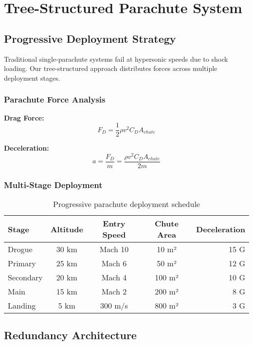 \documentclass[11pt,a4paper]{article}
\begin{document}
\section{Tree-Structured Parachute System}

\subsection{Progressive Deployment Strategy}

Traditional single-parachute systems fail at hypersonic speeds due to shock loading. Our tree-structured approach distributes forces across multiple deployment stages.

\subsubsection{Parachute Force Analysis}

\textbf{Drag Force:}
\begin{equation}
F_D = \frac{1}{2} \rho v^2 C_D A_{chute}
\end{equation}

\textbf{Deceleration:}
\begin{equation}
a = \frac{F_D}{m} = \frac{\rho v^2 C_D A_{chute}}{2m}
\end{equation}

\subsubsection{Multi-Stage Deployment}

\begin{table}[H]
\centering
\begin{tabular}{@{}lcccr@{}}
\toprule
\textbf{Stage} & \textbf{Altitude} & \textbf{Entry Speed} & \textbf{Chute Area} & \textbf{Deceleration} \\
\midrule
Drogue & 30 km & Mach 10 & 10 m² & 15 G \\
Primary & 25 km & Mach 6 & 50 m² & 12 G \\
Secondary & 20 km & Mach 4 & 100 m² & 10 G \\
Main & 15 km & Mach 2 & 200 m² & 8 G \\
Landing & 5 km & 300 m/s & 800 m² & 3 G \\
\bottomrule
\end{tabular}
\caption{Progressive parachute deployment schedule}
\label{tab:parachute_stages}
\end{table}

\subsection{Redundancy Architecture}
\end{document}
